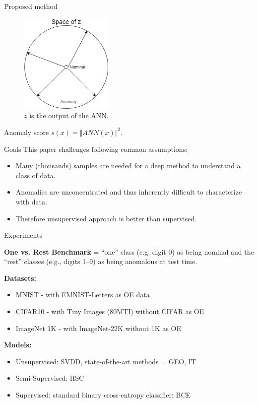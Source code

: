 \documentclass{beamer}
\begin{document}
\begin{frame}{Proposed method}
\begin{figure}[h]
\includegraphics[width=0.4\textwidth]{img/radial_loss}
\caption{$z$ is the output of the ANN.}
\end{figure}

Anomaly score $s(x) = \Vert ANN(x) \Vert ^2$.

\end{frame}
\begin{frame}{Goals}
This paper challenges following common assumptions:
\begin{itemize}
\item Many (thousands) samples are needed for a deep method to understand a class of data.
\item Anomalies are unconcentrated and thus inherently difficult to characterize with data.
\item Therefore unsupervised approach is better than supervised.
\end{itemize}

\end{frame}


\begin{frame}{Experiments}

\textbf{One vs. Rest Benchmark} = “one” class (e.g, digit 0) as being nominal and the “rest” classes (e.g., digits 1–9) as being anomalous at test time.

\vfill

\textbf{Datasets:}
\begin{itemize}
\item MNIST - with EMNIST-Letters as OE data
\item CIFAR10 - with Tiny Images (80MTI) without CIFAR as OE
\item ImageNet 1K - with ImageNet-22K without 1K as OE
\end{itemize}

\vfill

\textbf{Models:}
\begin{itemize}
\item Unsupervised: SVDD, state-of-the-art methods = GEO, IT
\item Semi-Supervised: HSC
\item Supervised: standard binary cross-entropy classifier: BCE
\end{itemize}


\end{frame}
\end{document}
